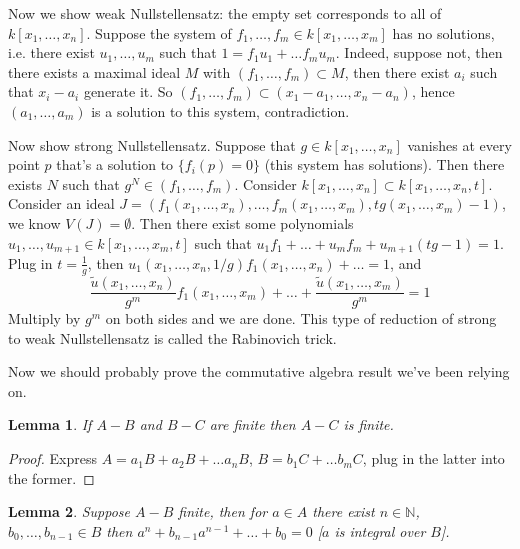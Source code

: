 \documentclass[12pt]{article}
\newtheorem{lemma}{Lemma}
\begin{document}
    Now we show weak Nullstellensatz: the empty set corresponds to all of $k[x_1, \dots, x_n]$. Suppose the system of $f_1, \dots, f_m \in k[x_1, \dots, x_m]$ has no solutions, i.e. there exist $u_1, \dots, u_m$ such that $1 = f_1u_1 + \dots f_mu_m$. Indeed, suppose not, then there exists a maximal ideal $M$ with $(f_1, \dots, f_m) \subset M$, then there exist $a_i$ such that $x_i - a_i$ generate it. So $(f_1, \dots, f_m) \subset (x_1-a_1, \dots, x_n - a_n)$, hence $(a_1, \dots, a_m)$ is a solution to this system, contradiction. \par 
    Now show strong Nullstellensatz. Suppose that $g \in k[x_1, \dots, x_n]$ vanishes at every point $p$ that's a solution to $\{f_i(p) = 0\}$ (this system has solutions). Then there exists $N$ such that $g^N \in (f_1, \dots, f_m)$. Consider $k[x_1, \dots, x_n] \subset k[x_1, \dots, x_n, t]$. Consider an ideal $J = (f_1(x_1, \dots, x_n), \dots, f_m(x_1, \dots, x_m), tg(x_1, \dots, x_m) - 1)$, we know $V(J) = \emptyset$. Then there exist some polynomials $u_1, \dots, u_{m+1} \in k[x_1, \dots, x_m, t]$ such that $u_1f_1 + \dots + u_mf_m + u_{m+1}(tg-1) = 1$. Plug in $t = \frac{1}{g}$, then $u_1(x_1, \dots, x_n, 1/g)f_1(x_1, \dots, x_n) + \dots = 1$, and 
    $$\frac{\tilde{u}(x_1, \dots, x_n)}{g^m}f_1(x_1, \dots, x_m) + \dots + \frac{\tilde{u}(x_1, \dots, x_m)}{g^m} = 1$$
    Multiply by $g^m$ on both sides and we are done. This type of reduction of strong to weak Nullstellensatz is called the Rabinovich trick. \par 
    Now we should probably prove the commutative algebra result we've been relying on. 
    \begin{lemma}
        If $A - B$ and $B - C$ are finite then $A - C$ is finite. 
    \end{lemma}
    \begin{proof}
        Express $A = a_1B + a_2B + \dots a_nB$, $B = b_1C + \dots b_mC$, plug in the latter into the former. 
    \end{proof}
    \begin{lemma}
        Suppose $A - B$ finite, then for $a \in A$ there exist $n \in \mathbb{N}$, $b_0, \dots, b_{n-1} \in B$ then $a^n + b_{n-1}a^{n-1} + \dots + b_0 = 0$ [$a$ is integral over $B$].
    \end{lemma}
\end{document}
